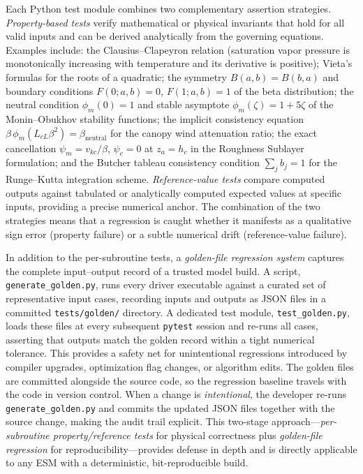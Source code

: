 Each Python test module combines two complementary assertion strategies.
\emph{Property-based tests} verify mathematical or physical invariants that hold
for all valid inputs and can be derived analytically from the governing equations.
Examples include: the Clausius--Clapeyron relation (saturation vapor pressure is
monotonically increasing with temperature and its derivative is positive); Vieta's
formulas for the roots of a quadratic; the symmetry $B(a,b)=B(b,a)$ and boundary
conditions $F(0;a,b)=0$, $F(1;a,b)=1$ of the beta distribution; the neutral
condition $\phi_m(0)=1$ and stable asymptote $\phi_m(\zeta)=1+5\zeta$ of the
Monin--Obukhov stability functions; the implicit consistency equation
$\beta\,\phi_m(L_{cL}\beta^2) = \beta_\mathrm{neutral}$ for the canopy wind
attenuation ratio; the exact cancellation $\psi_m = v_{kc}/\beta$, $\psi_c = 0$
at $z_a = h_c$ in the Roughness Sublayer formulation; and the Butcher tableau
consistency condition $\sum_j b_j = 1$ for the Runge--Kutta integration scheme.
\emph{Reference-value tests} compare computed outputs against tabulated or
analytically computed expected values at specific inputs, providing a precise
numerical anchor.  The combination of the two strategies means that a regression
is caught whether it manifests as a qualitative sign error (property failure) or a
subtle numerical drift (reference-value failure).

In addition to the per-subroutine tests, a \emph{golden-file regression system}
captures the complete input--output record of a trusted model build.  A script,
\texttt{generate\_golden.py}, runs every driver executable against a curated set
of representative input cases, recording inputs and outputs as JSON files in a
committed \texttt{tests/golden/} directory.  A dedicated test module,
\texttt{test\_golden.py}, loads these files at every subsequent \texttt{pytest}
session and re-runs all cases, asserting that outputs match the golden record
within a tight numerical tolerance.  This provides a safety net for unintentional
regressions introduced by compiler upgrades, optimization flag changes, or
algorithm edits.  The golden files are committed alongside the source code, so
the regression baseline travels with the code in version control.  When a change
is \emph{intentional}, the developer re-runs \texttt{generate\_golden.py} and
commits the updated JSON files together with the source change, making the audit
trail explicit.  This two-stage approach—\emph{per-subroutine property/reference
tests} for physical correctness plus \emph{golden-file regression} for
reproducibility—provides defense in depth and is directly applicable to any ESM
with a deterministic, bit-reproducible build.


